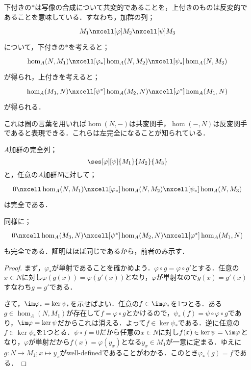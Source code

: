 下付きの$\ast$は写像の合成について共変的であることを，上付きのものは反変的であることを意味している．すなわち，加群の列；
\[\begin{tikzcd}
M_1\nxcell[\varphi]M_2\nxcell[\psi]M_3
\end{tikzcd}\]
について，下付きの$\ast$を考えると；
\[\begin{tikzcd}
\hom_A(N,M_1)\nxcell[\varphi_\ast]\hom_A(N,M_2)\nxcell[\psi_\ast]\hom_A(N,M_3)
\end{tikzcd}\]
が得られ，上付きを考えると；
\[\begin{tikzcd}
\hom_A(M_3,N)\nxcell[\psi^\ast]\hom_A(M_2,N)\nxcell[\varphi^\ast]\hom_A(M_1,N)
\end{tikzcd}\]
が得られる．

これは圏の言葉を用いれば$\hom(N,-)$は共変関手，$\hom(-,N)$は反変関手であると表現できる．これらは左完全になることが知られている．
\begin{prop}\label{prop:homは半完全}
$A$加群の完全列；
\[\ses[\varphi][\psi]{M_1}{M_2}{M_3}\]
と，任意の$A$加群$N$に対して；
\[\begin{tikzcd}
0\nxcell\hom_A(N,M_1)\nxcell[\varphi_\ast]\hom_A(N,M_2)\nxcell[\psi_\ast]\hom_A(N,M_3)
\end{tikzcd}\]
は完全である．
\end{prop}

同様に；
\[\begin{tikzcd}
0\nxcell\hom_A(M_3,N)\nxcell[\psi^\ast]\hom_A(M_2,N)\nxcell[\varphi^\ast]\hom_A(M_1,N)
\end{tikzcd}\]
も完全である．証明はほぼ同じであるから，前者のみ示す．
\begin{proof}
	まず，$\varphi_\ast $が単射であることを確かめよう．$\varphi\circ g=\varphi\circ g'$とする．任意の$x\in N$に対し$\varphi(g(x))=\varphi(g'(x))$となり，$\varphi$が単射なので$g(x)=g'(x)$すなわち$g=g'$である．
	
	さて，$\im\varphi_\ast =\ker\psi_\ast $を示せばよい．任意の$f\in\im\varphi_\ast$を1つとる．ある$g\in\hom_A(N,M_1)$が存在して$f=\varphi\circ g$とかけるので，$\psi_\ast (f)=\psi\circ\varphi\circ g$であり，$\im\varphi=\ker\psi$だからこれは消える．よって$f\in\ker\psi_\ast $である．逆に任意の$f\in\ker\psi_\ast $を1つとる．$\psi\circ f=0$だから任意の$x\in N$に対し$f(x)\in\ker\psi=\im\varphi$となり，$\varphi$が単射だから$f(x)=\varphi(y_x)$となる$y_x\in M_1$が一意に定まる．ゆえに$g:N\to M_1;x\mapsto y_x$がwell-definedであることがわかる．このとき$\varphi_\ast (g)=f$である．
\end{proof}

